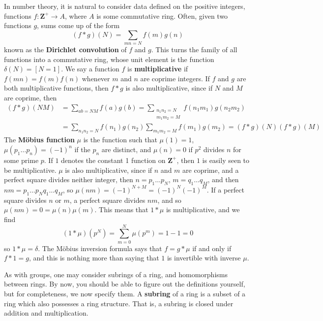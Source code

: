 \begin{example}
    In number theory, it is natural to consider data defined on the positive integers, functions $f: \mathbf{Z}^+ \to A$, where $A$ is some commutative ring. Often, given two functions $g$, sums come up of the form
    \[ (f * g)(N) = \sum_{mn = N} f(m) g(n) \]
    known as the {\bf Dirichlet convolution} of $f$ and $g$. This turns the family of all functions into a commutative ring, whose unit element is the function $\delta(N) = [N = 1]$. We say a function $f$ is {\bf multiplicative} if $f(mn) = f(m)f(n)$ whenever $m$ and $n$ are coprime integers. If $f$ and $g$ are both multiplicative functions, then $f * g$ is also multiplicative, since if $N$ and $M$ are coprime, then
    \begin{align*}
        (f * g)(NM) &= \sum_{ab = NM} f(a) g(b) = \sum_{\substack{n_1n_2 = N\\m_1m_2 = M}} f(n_1m_1) g(n_2m_2)\\
        &= \sum_{n_1n_2 = N} f(n_1)g(n_2) \sum_{m_1m_2 = M} f(m_1) g(m_2) = (f * g)(N) (f * g)(M)
    \end{align*}
    The {\bf M\"{o}bius function} $\mu$ is the function such that $\mu(1) = 1$, $\mu(p_1 \dots p_n) = (-1)^n$ if the $p_n$ are distinct, and $\mu(n) = 0$ if $p^2$ divides $n$ for some prime $p$. If $1$ denotes the constant 1 function on $\mathbf{Z}^+$, then $1$ is easily seen to be multiplicative. $\mu$ is also multiplicative, since if $n$ and $m$ are coprime, and a perfect square divides neither integer, then $n = p_1 \dots p_N$, $m = q_1 \dots q_M$, and then $nm = p_1 \dots p_N q_1 \dots q_M$, so $\mu(nm) = (-1)^{N+M} = (-1)^N (-1)^M$. If a perfect square divides $n$ or $m$, a perfect square divides $nm$, and so $\mu(nm) = 0 = \mu(n)\mu(m)$. This means that $1 * \mu$ is multiplicative, and we find
    \[ (1 * \mu)(p^N) = \sum_{m = 0}^N \mu(p^m) = 1 - 1 = 0 \]
    so $1 * \mu = \delta$. The M\"{o}bius inversion formula says that $f = g * \mu$ if and only if $f * 1 = g$, and this is nothing more than saying that $1$ is invertible with inverse $\mu$.
\end{example}

As with groups, one may consider subrings of a ring, and homomorphisms between rings. By now, you should be able to figure out the definitions yourself, but for completeness, we now specify them. A {\bf subring} of a ring is a subset of a ring which also possesses a ring structure. That is, a subring is closed under addition and multiplication.

